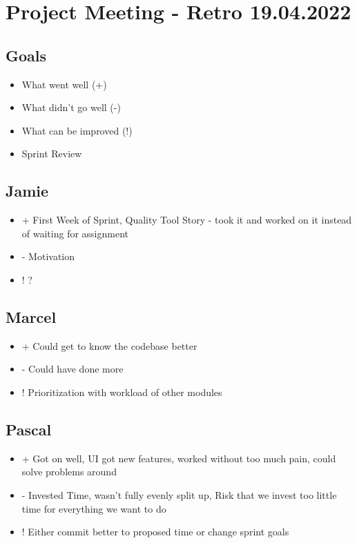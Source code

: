 \section{Project Meeting - Retro 19.04.2022}

\subsection{Goals}
\begin{itemize}
    \item What went well (+)
    \item What didn't go well (-)
    \item What can be improved (!)
    \item Sprint Review
\end{itemize}

\subsection{Jamie}
\begin{itemize}
    \item + First Week of Sprint, Quality Tool Story - took it and worked on it instead of waiting for assignment
    \item - Motivation
    \item ! ?
\end{itemize}

\subsection{Marcel}
\begin{itemize}
    \item + Could get to know the codebase better
    \item - Could have done more
    \item ! Prioritization with workload of other modules
\end{itemize}

\subsection{Pascal}
\begin{itemize}
    \item + Got on well, UI got new features, worked without too much pain, could solve problems around
    \item - Invested Time, wasn't fully evenly split up, Risk that we invest too little time for everything we want to do
    \item ! Either commit better to proposed time or change sprint goals
\end{itemize}

